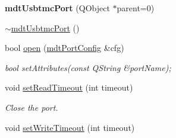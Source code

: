 \begin{DoxyCompactItemize}
\item 
\hypertarget{classmdt_usbtmc_port_a102a2d5ebad4968621812e682d9d1b71}{
{\bfseries mdtUsbtmcPort} (QObject $\ast$parent=0)}
\label{classmdt_usbtmc_port_a102a2d5ebad4968621812e682d9d1b71}

\item 
\hyperlink{classmdt_usbtmc_port_a3f9d3f1f40f61e17fa2997f3ad181d30}{$\sim$mdtUsbtmcPort} ()
\item 
bool \hyperlink{classmdt_usbtmc_port_acf677164611ea563e40be93e1b36236a}{open} (\hyperlink{classmdt_port_config}{mdtPortConfig} \&cfg)
\begin{DoxyCompactList}\small\item\em bool setAttributes(const QString \&portName); \end{DoxyCompactList}\item 
void \hyperlink{classmdt_usbtmc_port_ad3ec37dab7918fad36190b1c4c58c266}{setReadTimeout} (int timeout)
\begin{DoxyCompactList}\small\item\em Close the port. \end{DoxyCompactList}\item 
\hypertarget{classmdt_usbtmc_port_a18ff8b76d07cd75339204f9389e1dd5c}{
void \hyperlink{classmdt_usbtmc_port_a18ff8b76d07cd75339204f9389e1dd5c}{setWriteTimeout} (int timeout)}
\label{classmdt_usbtmc_port_a18ff8b76d07cd75339204f9389e1dd5c}


\end{DoxyCompactItemize}
